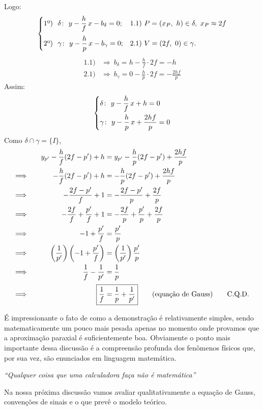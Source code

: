 \documentclass[11pt,a4paper]{article}
\begin{document}
\medskip
Logo:
\[
  \begin{dcases}
    \text{1º)}\ \ \delta\colon\ y - \frac{h}{f}\,x - b_\delta = 0; &
      \text{1.1)}\ P = (x_P,\ h) \in \delta,\ x_P \approx 2f\\[2pt]
    \text{2º)}\ \ \gamma\colon\ y - \frac{h}{p}\,x - b_\gamma = 0; &
      \text{2.1)}\ V = (2f,\ 0) \in \gamma.
  \end{dcases}
\]
\begin{align*}
  \text{1.1)} &\Longrightarrow\ b_\delta = h - \frac{h}{f}\cdot 2f = -h\\
  \text{2.1)} &\Longrightarrow\ b_\gamma = 0 - \frac{h}{p}\cdot 2f = -\frac{2hf}{p}
\end{align*}
Assim:
\[
  \begin{dcases}
    \delta\colon\ y - \frac{h}{f}\,x + h = 0\\
    \gamma\colon\ y - \frac{h}{p}\,x + \frac{2hf}{p} = 0
  \end{dcases}
\]
Como $\delta \cap \gamma = \{I\}$,
\begin{alignat}{2}
  & & y_{p'} - \frac{h}{f}(2f - p') + h
    &= y_{p'} - \frac{h}{p}(2f - p') + \frac{2hf}{p} \notag\\
  \Longrightarrow\quad & & -\frac{h}{f}(2f - p') + h
    &= -\frac{h}{p}(2f - p') + \frac{2hf}{p} \notag\\
  \Longrightarrow\quad & & -\frac{2f - p'}{f} + 1
    &= -\frac{2f - p'}{p} + \frac{2f}{p} \notag\\
  \Longrightarrow\quad & & -\frac{2f}{f} + \frac{p'}{f} + 1
    &= -\frac{2f}{p} + \frac{p'}{p} + \frac{2f}{p} \notag\\
  \Longrightarrow\quad & & -1 + \frac{p'}{f}
    &= \frac{p'}{p} \notag\\
  \Longrightarrow\quad & & \left(\frac{1}{p'}\right)\left(-1 + \frac{p'}{f}\right)
    &= \left(\frac{1}{p'}\right)\frac{p'}{p} \notag\\
  \Longrightarrow\quad & & \frac{1}{f} - \frac{1}{p'}
    &= \frac{1}{p} \notag\\[2pt]
  \Longrightarrow\quad & & \Aboxed{\frac{1}{f}
    &= \frac{1}{p} + \frac{1}{p'}}
    \qquad \text{(equação de Gauss)} \qquad \text{C.Q.D.} \label{eq:gauss}
\end{alignat}

É impressionante o fato de como a demonstração é relativamente simples, sendo
matematicamente um pouco mais pesada apenas no momento onde provamos que a
aproximação paraxial é suficientemente boa. Obviamente o ponto mais importante
dessa discussão é a compreensão profunda dos fenômenos físicos que, por sua vez,
são enunciados em linguagem matemática.

{\centering\itshape
  \enquote{Qualquer coisa que uma calculadora faça não é matemática}\par}

Na nossa próxima discussão vamos avaliar qualitativamente a equação de Gauss,
convenções de sinais e o que prevê o modelo teórico.
\end{document}
